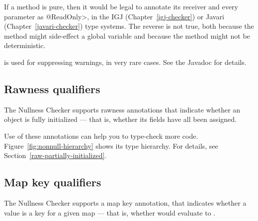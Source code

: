 \begin{description}
  If a method is pure, then it would be legal to annotate its receiver and
  every parameter as \<@ReadOnly>, in the IGJ (Chapter~\ref{igj-checker}) or
  Javari (Chapter~\ref{javari-checker}) type systems.  The reverse is not
  true, both because the method might side-effect a global variable and
  because the method might not be deterministic.

\item[\code{@\refclass{nullness/quals}{AssertParametersNonNull}}]
  is used for suppressing warnings, in very rare cases.  See the Javadoc for
  details.

\end{description}


\subsection{Rawness qualifiers\label{rawness-qualifiers-overview}}

The Nullness Checker supports rawness annotations that indicate whether
an object is fully initialized --- that is, whether its fields have all
been assigned.

\begin{description}
\item[]
\item[]
\item[]
\end{description}

Use of these annotations can help you to type-check more
code.  Figure~\ref{fig:nonnull-hierarchy} shows its type hierarchy.  For
details, see Section~\ref{raw-partially-initialized}.


\subsection{Map key qualifiers\label{map-key-qualifiers}}

The Nullness Checker supports a map key annotation,  that indicates whether
a value is a key for a given map --- that is, whether
 would evaluate to .

\begin{description}
\item[]
\end{description}

